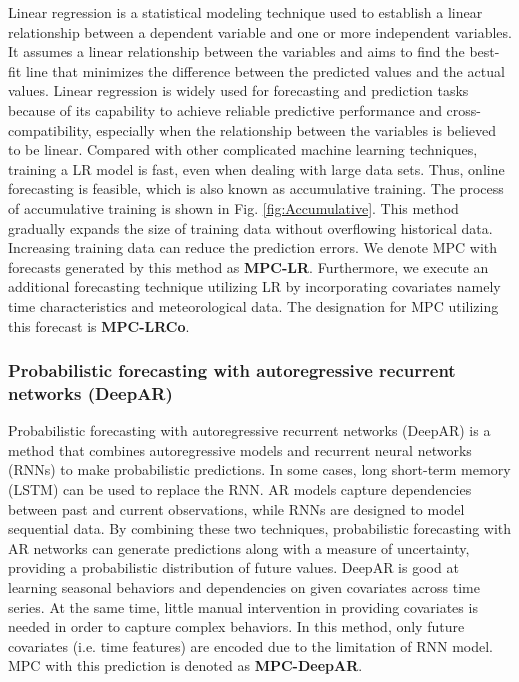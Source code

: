 Linear regression is a statistical modeling technique used to establish a linear relationship between a dependent variable and one or more independent variables. It assumes a linear relationship between the variables and aims to find the best-fit line that minimizes the difference between the predicted values and the actual values. Linear regression is widely used for forecasting and prediction tasks because of its capability to achieve reliable predictive performance and cross-compatibility\cite{city_scale_pred}, especially when the relationship between the variables is believed to be linear. Compared with other complicated machine learning techniques, training a LR model is fast, even when dealing with large data sets. Thus, online forecasting is feasible, which is also known as accumulative training. The process of accumulative training is shown in Fig. \ref{fig:Accumulative}. This method gradually expands the size of training data without overflowing historical data. Increasing training data can reduce the prediction errors\cite{online_LR}. We denote MPC with forecasts generated by this method as \textbf{MPC-LR}. Furthermore, we execute an additional forecasting technique utilizing LR by incorporating covariates namely time characteristics and meteorological data. The designation for MPC utilizing this forecast is \textbf{MPC-LRCo}.

\subsubsection{Probabilistic forecasting with autoregressive recurrent networks (DeepAR)}

Probabilistic forecasting with autoregressive recurrent networks (DeepAR) is a method that combines autoregressive models and recurrent neural networks (RNNs) to make probabilistic predictions. In some cases, long short-term memory (LSTM) can be used to replace the RNN. AR models capture dependencies between past and current observations, while RNNs are designed to model sequential data. By combining these two techniques, probabilistic forecasting with AR networks can generate predictions along with a measure of uncertainty, providing a probabilistic distribution of future values. DeepAR is good at learning seasonal behaviors and dependencies on given covariates across time series. At the same time, little manual intervention in providing covariates is needed in order to capture complex behaviors\cite{DeepAR}. In this method, only future covariates (i.e. time features) are encoded due to the limitation of RNN model. MPC with this prediction is denoted as \textbf{MPC-DeepAR}.

